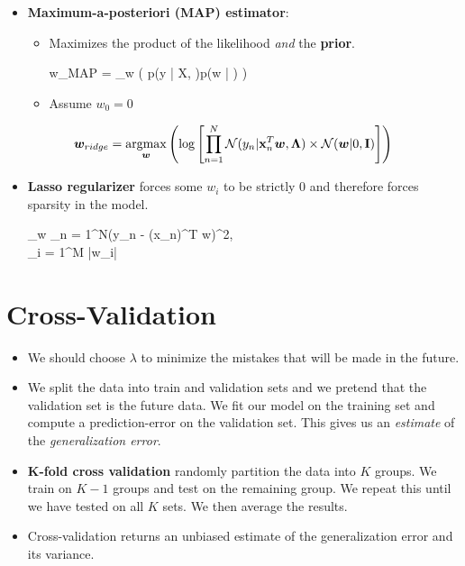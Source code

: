 \begin{itemize}
    \item \textbf{Maximum-a-posteriori (MAP) estimator}: %
	     \begin{itemize}
	     	\item Maximizes the product of the likelihood \textit{and} the \textbf{prior}.
	     	\begin{myalign*}
	     	     \bm w_{MAP} = \argmax_{\bm w} 
	     	     \left(
	     	     	p(\*y | \*X, \bm \Lambda)p(\bm w | \bm \Sigma)
	     	     \right)
	     	 \end{myalign*} 
	     	\item Assume $w_0 = 0$
	     	\end{itemize}
	     	\end{itemize}
$$
    \bm w_{ridge} = \operatorname*{argmax}_{\bm w}
    \left(
	    \log 
	    \left[
		\prod_{n = 1}^N \mathcal{N}(y_n | \mathbf{x}^T_n \bm w, \bm \Lambda) \times \mathcal{N}(\bm w | 0, \mathbf{I})
	    \right]
	\right)
$$
	\begin{itemize}
	\item \textbf{Lasso regularizer} forces some $w_i$ to be strictly 0 and therefore forces sparsity in the model.
	\begin{myalign*}
	    \min_{\bm w}  \sum_{n = 1}^N(y_n - \bm{\tilde{\phi}}(\*x_n)^T \bm w)^2, \hspace{10pt} \\ \sum_{i = 1}^M |w_i| \leq \tau
	\end{myalign*}
\end{itemize}


\section{Cross-Validation}
\begin{itemize}
	\item We should choose $\lambda$ to minimize the mistakes that will be made in the future.
	\item We split the data into train and validation sets and we pretend that the validation set is the future data. We fit our model on the training set and compute a prediction-error on the validation set. This gives us an \textit{estimate} of the \textit{generalization error}.
	\item \textbf{K-fold cross validation} randomly partition the data into $K$ groups. We train on $K - 1$ groups and test on the remaining group. We repeat this until we have tested on all $K$ sets. We then average the results.
	\item Cross-validation returns an unbiased estimate of the generalization error and its variance.
\end{itemize}

